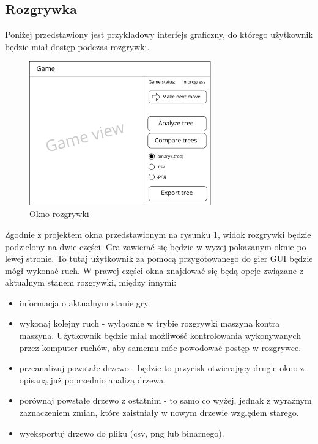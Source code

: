 \documentclass{article}
\begin{document}
	\clearpage
	
	\subsection{Rozgrywka}
	Poniżej przedstawiony jest przykładowy interfejs graficzny, do którego użytkownik będzie miał dostęp podczas rozgrywki.
	\begin{figure}[h!]
		\centering
		\includegraphics[width=0.7\textwidth]{game-eps}
		\caption{Okno rozgrywki}
		\label{rys:game_view}
	\end{figure}

	\noindent Zgodnie z projektem okna przedstawionym na rysunku \ref{rys:game_view}, widok rozgrywki będzie podzielony na dwie części. Gra zawierać się będzie w wyżej pokazanym oknie po lewej stronie. To tutaj użytkownik za pomocą przygotowanego do gier GUI będzie mógł wykonać ruch. W prawej części okna znajdować się będą opcje związane z aktualnym stanem rozgrywki, między innymi:\\
	
	\begin{itemize}
		\item informacja o aktualnym stanie gry.
		\item wykonaj kolejny ruch - wyłącznie w trybie rozgrywki maszyna kontra maszyna. Użytkownik będzie miał możliwość kontrolowania wykonywanych przez komputer ruchów, aby samemu móc powodować postęp w rozgrywce.
		\item przeanalizuj powstałe drzewo - będzie to przycisk otwierający drugie okno z opisaną już poprzednio analizą drzewa.
		\item porównaj powstałe drzewo z ostatnim - to samo co wyżej, jednak z wyraźnym zaznaczeniem zmian, które zaistniały w nowym drzewie względem starego.
		\item wyeksportuj drzewo do pliku (csv, png lub binarnego).
	\end{itemize}
	
\end{document}
